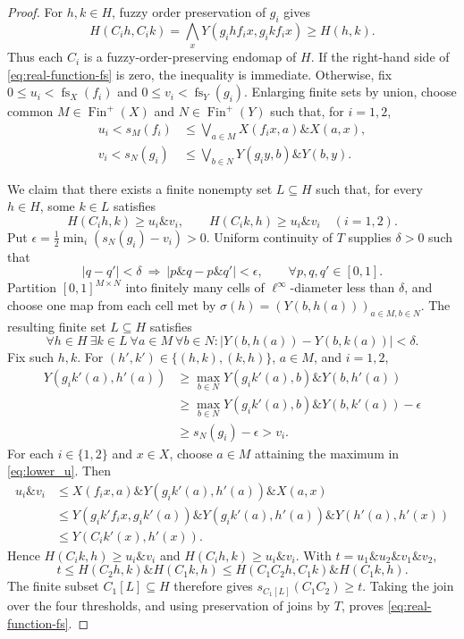 \documentclass[preprint,3p,times]{elsarticle}
\theoremstyle{definition}
\theoremstyle{remark}
\newcommand{\fs}{\operatorname{fs}}
\newcommand{\Finp}{\operatorname{Fin}^{+}}
\newcommand{\tn}{\mathbin{\&}}
\numberwithin{equation}{section}
\begin{document}
\begin{proof}
For \(h,k\in H\), fuzzy order preservation of \(g_i\) gives
\[
 H(C_i h,C_i k)
 =\bigwedge_xY(g_i h f_i x,g_i k f_i x)\geq H(h,k).
\]
Thus each \(C_i\) is a fuzzy-order-preserving endomap of \(H\). If the right-hand side of \eqref{eq:real-function-fs} is zero, the inequality is immediate. Otherwise, fix
\(0\leq u_i<\fs_X(f_i)\) and \(0\leq v_i<\fs_Y(g_i)\).
Enlarging finite sets by union, choose common \(M\in\Finp(X)\) and
\(N\in\Finp(Y)\) such that, for \(i=1,2\),
\begin{align}
 u_i<s_M(f_i)&\leq\bigvee_{a\in M}X(f_i x,a)\tn X(a,x),
 \label{eq:lower_u}\\
 v_i<s_N(g_i)&\leq\bigvee_{b\in N}Y(g_i y,b)\tn Y(b,y).
 \label{eq:lower_v}
\end{align}

We claim that there exists a finite nonempty set \(L\subseteq H\) such that, for every \(h\in H\), some \(k\in L\) satisfies
\[
H(C_i h,k)\ge u_i\tn v_i,\qquad
H(C_i k,h)\ge u_i\tn v_i
\quad(i=1,2).
\]
Put \(\epsilon=\tfrac12\min_i(s_N(g_i)-v_i)>0\).
Uniform continuity of \(T\) supplies \(\delta>0\) such that
\[
 |q-q'|<\delta\ \Longrightarrow\
 |p\tn q-p\tn q'|<\epsilon,
 \qquad \forall p,q,q'\in[0,1].
\]
Partition \([0,1]^{M\times N}\) into finitely many cells of \(\ell^\infty\)-diameter less than \(\delta\), and choose one map from each cell met by \(\sigma(h)=(Y(b,h(a)))_{a\in M,b\in N}\). The resulting finite set \(L\subseteq H\) satisfies
\[
 \forall h\in H\ \exists k\in L\ \forall a\in M\ \forall b\in N:
 |Y(b,h(a))-Y(b,k(a))|<\delta.
\]
Fix such \(h,k\). For \((h',k')\in\{(h,k),(k,h)\}\), \(a\in M\), and \(i=1,2\),
\begin{align*}
 Y(g_i k'(a),h'(a))
 &\geq\max_{b\in N}Y(g_i k'(a),b)\tn Y(b,h'(a))\\
 &\geq\max_{b\in N}Y(g_i k'(a),b)\tn Y(b,k'(a))-\epsilon\\
 &\geq s_N(g_i)-\epsilon>v_i.
\end{align*}
For each \(i\in\{1,2\}\) and \(x\in X\), choose \(a\in M\) attaining the maximum in
\eqref{eq:lower_u}. Then
\begin{align*}
 u_i\tn v_i
 &\leq X(f_i x,a)\tn Y(g_i k'(a),h'(a))\tn X(a,x)\\
 &\leq Y(g_i k'f_i x,g_i k'(a))\tn Y(g_i k'(a),h'(a))\tn Y(h'(a),h'(x))\\
 &\leq Y(C_i k'(x),h'(x)).
\end{align*}
Hence \(H(C_i k,h)\geq u_i\tn v_i\) and \(H(C_i h,k)\geq u_i\tn v_i\). With \(t=u_1\tn u_2\tn v_1\tn v_2\),
\[
 t\leq H(C_2h,k)\tn H(C_1k,h)
 \leq H(C_1C_2h,C_1k)\tn H(C_1k,h).
\]
The finite subset \(C_1[L]\subseteq H\) therefore gives \(s_{C_1[L]}(C_1C_2)\geq t\). Taking the join over the four thresholds, and using preservation of joins by \(T\), proves
\eqref{eq:real-function-fs}.
\end{proof}
\end{document}
